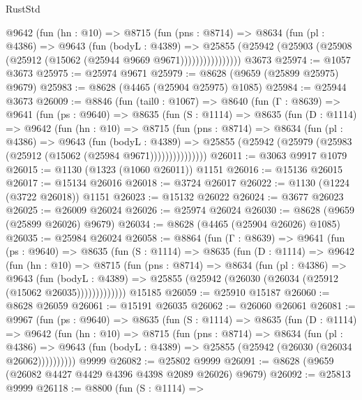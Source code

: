 \begin{lexlean}{RustStd}
\begin{coremodule}
              @9642
                (fun (hn : @10) =>
                @8715
                  (fun (pns : @8714) =>
                  @8634
                    (fun (pl : @4386) =>
                    @9643
                      (fun (bodyL : @4389) =>
                      @25855
                        (@25942 (@25903 (@25908 (@25912 (@15062 (@25944 @9669 @9671))))))))))))))))
    @3673
@25974 := @1057 @3673
@25975 := @25974 @9671
@25979 := @8628 (@9659 (@25899 @25975) @9679)
@25983 := @8628 (@4465 (@25904 @25975) @1085)
@25984 := @25944 @3673
@26009 := @8846
    (fun (tail0 : @1067) =>
    @8640
      (fun (Γ : @8639) =>
      @9641
        (fun (ps : @9640) =>
        @8635
          (fun (S : @1114) =>
          @8635
            (fun (D : @1114) =>
            @9642
              (fun (hn : @10) =>
              @8715
                (fun (pns : @8714) =>
                @8634
                  (fun (pl : @4386) =>
                  @9643
                    (fun (bodyL : @4389) =>
                    @25855 (@25942 (@25979 (@25983 (@25912 (@15062 (@25984 @9671)))))))))))))))
@26011 := @3063 @9917 @1079
@26015 := @1130 (@1323 (@1060 @26011)) @1151
@26016 := @15136 @26015
@26017 := @15134 @26016
@26018 := @3724 @26017
@26022 := @1130 (@1224 (@3722 @26018)) @1151
@26023 := @15132 @26022
@26024 := @3677 @26023
@26025 := @26009 @26024
@26026 := @25974 @26024
@26030 := @8628 (@9659 (@25899 @26026) @9679)
@26034 := @8628 (@4465 (@25904 @26026) @1085)
@26035 := @25984 @26024
@26058 := @8864
    (fun (Γ : @8639) =>
    @9641
      (fun (ps : @9640) =>
      @8635
        (fun (S : @1114) =>
        @8635
          (fun (D : @1114) =>
          @9642
            (fun (hn : @10) =>
            @8715
              (fun (pns : @8714) =>
              @8634
                (fun (pl : @4386) =>
                @9643
                  (fun (bodyL : @4389) =>
                  @25855 (@25942 (@26030 (@26034 (@25912 (@15062 @26035)))))))))))))
    @15185
@26059 := @25910 @15187
@26060 := @8628 @26059
@26061 := @15191 @26035
@26062 := @26060 @26061
@26081 := @9967
    (fun (ps : @9640) =>
    @8635
      (fun (S : @1114) =>
      @8635
        (fun (D : @1114) =>
        @9642
          (fun (hn : @10) =>
          @8715
            (fun (pns : @8714) =>
            @8634
              (fun (pl : @4386) =>
              @9643 (fun (bodyL : @4389) => @25855 (@25942 (@26030 (@26034 @26062))))))))))
    @9999
@26082 := @25802 @9999
@26091 := @8628 (@9659 (@26082 @4427 @4429 @4396 @4398 @2089 @26026) @9679)
@26092 := @25813 @9999
@26118 := @8800
    (fun (S : @1114) =>

\end{coremodule}
\end{lexlean}
